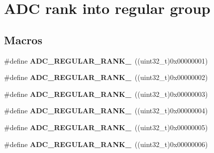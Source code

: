 \hypertarget{group___a_d_c__regular__rank}{\section{A\-D\-C rank into regular group}
\label{group___a_d_c__regular__rank}
}
\subsection*{Macros}
\begin{DoxyCompactItemize}
\item 
\hypertarget{group___a_d_c__regular__rank_gadf298d930c7a4f313ece62320dbd600c}{\#define {\bfseries A\-D\-C\-\_\-\-R\-E\-G\-U\-L\-A\-R\-\_\-\-R\-A\-N\-K\-\_}~((uint32\-\_\-t)0x00000001)}\label{group___a_d_c__regular__rank_gadf298d930c7a4f313ece62320dbd600c}

\item 
\hypertarget{group___a_d_c__regular__rank_ga21f2593d1950de1b7f98770a21009826}{\#define {\bfseries A\-D\-C\-\_\-\-R\-E\-G\-U\-L\-A\-R\-\_\-\-R\-A\-N\-K\-\_}~((uint32\-\_\-t)0x00000002)}\label{group___a_d_c__regular__rank_ga21f2593d1950de1b7f98770a21009826}

\item 
\hypertarget{group___a_d_c__regular__rank_gadaab09acdc0504f6ed8a84d7de6170dc}{\#define {\bfseries A\-D\-C\-\_\-\-R\-E\-G\-U\-L\-A\-R\-\_\-\-R\-A\-N\-K\-\_}~((uint32\-\_\-t)0x00000003)}\label{group___a_d_c__regular__rank_gadaab09acdc0504f6ed8a84d7de6170dc}

\item 
\hypertarget{group___a_d_c__regular__rank_gae23fcbfa4f2a1c919038739cbcb57410}{\#define {\bfseries A\-D\-C\-\_\-\-R\-E\-G\-U\-L\-A\-R\-\_\-\-R\-A\-N\-K\-\_}~((uint32\-\_\-t)0x00000004)}\label{group___a_d_c__regular__rank_gae23fcbfa4f2a1c919038739cbcb57410}

\item 
\hypertarget{group___a_d_c__regular__rank_ga288d36b6b6e483116ca423ee5709580e}{\#define {\bfseries A\-D\-C\-\_\-\-R\-E\-G\-U\-L\-A\-R\-\_\-\-R\-A\-N\-K\-\_}~((uint32\-\_\-t)0x00000005)}\label{group___a_d_c__regular__rank_ga288d36b6b6e483116ca423ee5709580e}

\item 
\hypertarget{group___a_d_c__regular__rank_ga6636e3943689f2a196256c939b3aa5f5}{\#define {\bfseries A\-D\-C\-\_\-\-R\-E\-G\-U\-L\-A\-R\-\_\-\-R\-A\-N\-K\-\_}~((uint32\-\_\-t)0x00000006)}\label{group___a_d_c__regular__rank_ga6636e3943689f2a196256c939b3aa5f5}


\end{DoxyCompactItemize}
